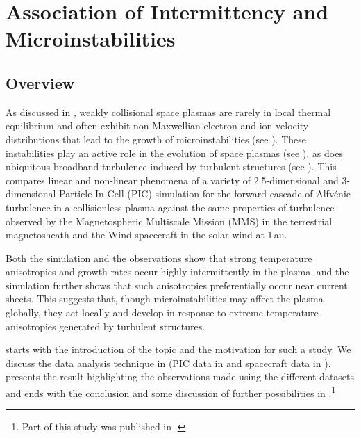 %
%
\chapter{Association of Intermittency and Microinstabilities} \label{chap:chap5}

    \section{Overview} \label{sec:ovrvw5}

        As discussed in , weakly collisional space plasmas are rarely in local
        thermal equilibrium and often exhibit non-Maxwellian electron and ion velocity distributions
        that lead to the growth of microinstabilities (see ). These instabilities
        play an active role in the evolution of space plasmas (see ), as does
        ubiquitous broadband turbulence induced by turbulent structures (see ).
        This  compares linear and non-linear phenomena of a variety of
        2.5-dimensional and 3-dimensional Particle-In-Cell (PIC) simulation for the forward cascade
        of Alfv\'enic turbulence in a collisionless plasma against the same properties of turbulence
        observed by the Magnetospheric Multiscale Mission (MMS) in the terrestrial magnetosheath and
        the Wind spacecraft in the solar wind at 1\,au.

        Both the simulation and the observations show that strong temperature anisotropies and
        growth rates occur highly intermittently in the plasma, and the simulation further shows
        that such anisotropies preferentially occur near current sheets. This suggests that, though
        microinstabilities may affect the plasma globally, they act locally and develop in response
        to extreme temperature anisotropies generated by turbulent structures.

         starts with the introduction of the topic and the motivation for such a
        study. We discuss the data analysis technique in  (PIC data in
         and spacecraft data in ).  presents the result
        highlighting the observations made using the different datasets and ends with the conclusion
        and some discussion of further possibilities in .\footnote{Part of this
        study was published in \citet{Qudsi2020a}.}

